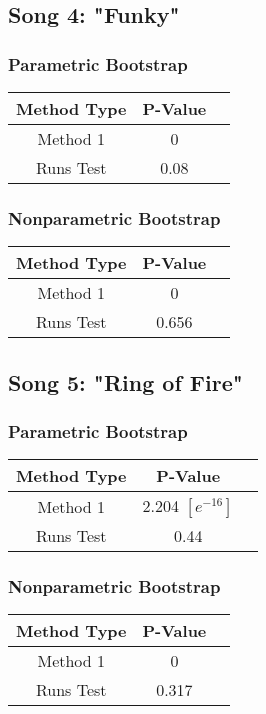\documentclass[12pt, letterpaper]{article}
\begin{document}
\subsection{Song 4: "Funky"}
\subsubsection{Parametric Bootstrap}

\begin{tabular}{|c|c|c|}
\hline
\textbf{Method Type} & P-Value \\
\hline
Method 1 & 0 \\
\hline
Runs Test & 0.08  \\ 
\hline
\end{tabular}

\subsubsection{Nonparametric Bootstrap}
\begin{tabular}{|c|c|c|}
\hline
\textbf{Method Type} & P-Value \\
\hline
Method 1 & 0  \\
\hline
Runs Test & 0.656 \\ 
\hline
\end{tabular}

\subsection{Song 5: "Ring of Fire"}
\subsubsection{Parametric Bootstrap}

\begin{tabular}{|c|c|c|}
\hline
\textbf{Method Type} & P-Value  \\
\hline
Method 1 & 2.204 $[e^{-16}]$ \\
\hline
Runs Test & 0.44 \\ 
\hline
\end{tabular}

\subsubsection{Nonparametric Bootstrap}
\begin{tabular}{|c|c|c|}
\hline
\textbf{Method Type} & P-Value \\
\hline
Method 1 & 0  \\
\hline
Runs Test & 0.317 \\ 
\hline
\end{tabular}
\end{document}
